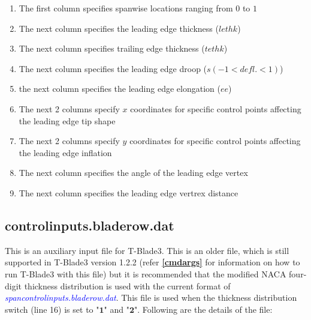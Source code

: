 \documentclass[8pt]{article}
\begin{document}
\begin{itemize}[leftmargin=*]
\begin{enumerate}[label=\alph*]
        \item The first column specifies spanwise locations ranging from $0$ to $1$
        \item The next column specifies the leading edge thickness ($lethk$)
        \item The next column specifies trailing edge thickness ($tethk$)
        \item The next column specifies the leading edge droop ($s(-1<defl.<1)$)
        \item the next column specifies the leading edge elongation ($ee$)
        \item The next 2 columns specify $x$ coordinates for specific control points affecting the leading edge tip shape
        \item The next 2 columns specify $y$ coordinates for specific control points affecting the leading edge inflation
        \item The next column specifies the angle of the leading edge vertex 
        \item The next column specifies the leading edge vertrex distance
    \end{enumerate}
\end{itemize}

\subsection{controlinputs.bladerow.dat}\label{auxinput2}
\noindent
This is an auxiliary input file for T-Blade3. This is an older file, which is still supported in T-Blade3 version 1.2.2 (refer \textbf{\ref{cmdargs}} for information on how to run T-Blade3 with this file) but it is recommended that the modified NACA four-digit thickness distribution is used with the current format of \textit{\textcolor{blue}{spancontrolinputs.bladerow.dat}}. This file is used when the thickness distribution switch (line 16) is set to "$\mathbf{1}$" and "$\mathbf{2}$". Following are the details of the file:
\end{document}
